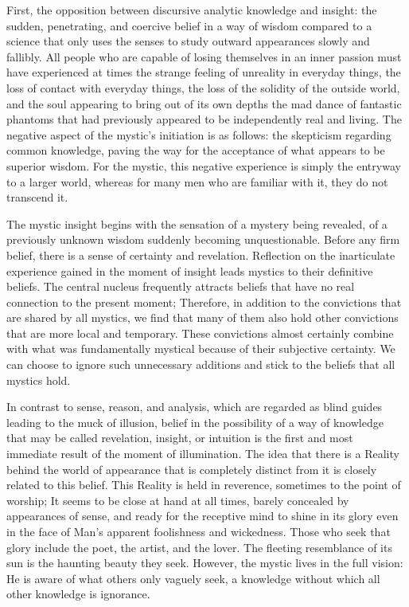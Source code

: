 \documentclass[a4paper,12pt]{book}[2004/02/16]
\theoremstyle{ilemma}
\theoremstyle{itheorem}
\theoremstyle{iother}
\theoremstyle{icorollary}
\theoremstyle{numcorollary}
\theoremstyle{idefinition}
\begin{document}
First, the opposition between discursive analytic knowledge and insight: the sudden, penetrating, and coercive belief in a way of wisdom compared to a science that only uses the senses to study outward appearances slowly and fallibly. All people who are capable of losing themselves in an inner passion must have experienced at times the strange feeling of unreality in everyday things, the loss of contact with everyday things, the loss of the solidity of the outside world, and the soul appearing to bring out of its own depths the mad dance of fantastic phantoms that had previously appeared to be independently real and living. The negative aspect of the mystic's initiation is as follows: the skepticism regarding common knowledge, paving the way for the acceptance of what appears to be superior wisdom. For the mystic, this negative experience is simply the entryway to a larger world, whereas for many men who are familiar with it, they do not transcend it.

The mystic insight begins with the sensation of a mystery being revealed, of a previously unknown wisdom suddenly becoming unquestionable. Before any firm belief, there is a sense of certainty and revelation. Reflection on the inarticulate experience gained in the moment of insight leads mystics to their definitive beliefs. The central nucleus frequently attracts beliefs that have no real connection to the present moment;
Therefore, in addition to the convictions that are shared by all mystics, we find that many of them also hold other convictions that are more local and temporary. These convictions almost certainly combine with what was fundamentally mystical because of their subjective certainty. We can choose to ignore such unnecessary additions and stick to the beliefs that all mystics hold.

In contrast to sense, reason, and analysis, which are regarded as blind guides leading to the muck of illusion, belief in the possibility of a way of knowledge that may be called revelation, insight, or intuition is the first and most immediate result of the moment of illumination. The idea that there is a Reality behind the world of appearance that is completely distinct from it is closely related to this belief.
This Reality is held in reverence, sometimes to the point of worship; It seems to be close at hand at all times, barely concealed by appearances of sense, and ready for the receptive mind to shine in its glory even in the face of Man's apparent foolishness and wickedness.
Those who seek that glory include the poet, the artist, and the lover. The fleeting resemblance of its sun is the haunting beauty they seek.
However, the mystic lives in the full vision: He is aware of what others only vaguely seek, a knowledge without which all other knowledge is ignorance.
\end{document}
